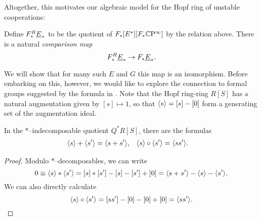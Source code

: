 Altogether, this motivates our algebraic model for the Hopf ring of unstable cooperations:

\begin{definition}\label{ComparisonMapInCOUnstableCoopns}
Define $F_*^R \underline{\smash{E}}_{*}$ to be the quotient of $F_*[E^*][F_* \mathbb{C}\mathrm P^\infty]$ by the relation above.  There is a natural \textit{comparison map} \[F_*^R \underline{\smash{E}}_{*} \to F_* \underline{\smash{E}}_{*}.\]
\end{definition}

We will show that for many such $E$ and $G$ this map is an isomorphism.  Before embarking on this, however, we would like to explore the connection to formal groups suggested by the formula in .  Note that the Hopf ring-ring $R[S]$ has a natural augmentation given by $[s] \mapsto 1$, so that $\langle s\rangle = [s] - [0]$ form a generating set of the augmentation ideal.
\begin{lemma}\label{ArithmeticInQAst}
In the $\ast$--indecomposable quotient $Q^* R[S]$, there are the formulas
\begin{align*}
\langle s\rangle + \langle s'\rangle & = \langle s + s'\rangle, &
\langle s\rangle \circ \langle s'\rangle & = \langle s s'\rangle.
\end{align*}
\end{lemma}
\begin{proof}
Modulo $\ast$--decomposables, we can write  \[0 \equiv \langle s\rangle \ast \langle s'\rangle = [s] \ast [s'] - [s] - [s'] + [0] = \langle s + s'\rangle - \langle s\rangle - \langle s'\rangle.\]  We can also directly calculate \[\langle s\rangle \circ \langle s'\rangle = [s s'] - [0] - [0] + [0] = \langle s s'\rangle. \qedhere\]
\end{proof}

